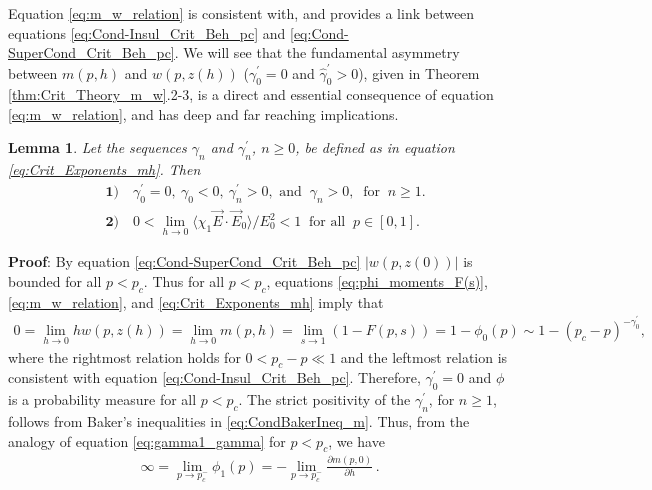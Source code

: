 \documentclass[english,12pt,jmp,graphicx]{revtex4-1}
\newtheorem{lemma}{Lemma}[section]
\newcommand{\gh}{\hat{\gamma}}
\begin{document}
Equation \eqref{eq:m_w_relation} is consistent with, and provides a
link between equations \eqref{eq:Cond-Insul_Crit_Beh_pc} and
\eqref{eq:Cond-SuperCond_Crit_Beh_pc}. We will see that the
fundamental asymmetry  between $m(p,h)$ and $w(p,z(h))$ ($\gamma_0^\prime=0$ and
$\gh_0^\prime>0$), given in Theorem \ref{thm:Crit_Theory_m_w}.2-3, is a
direct and essential consequence of equation \eqref{eq:m_w_relation},
and has deep and far reaching implications.      
%
\begin{lemma}\label{lem:zero_gamma0}
  Let the sequences $\gamma_n$ and $\gamma_n^\prime$, $n\geq0$, be defined as in
  equation \eqref{eq:Crit_Exponents_mh}. Then
  \begin{align*}
    &\mathbf{1)} \quad \gamma_0^\prime=0, \ \gamma_0<0, \ \gamma_n^\prime>0,   \text{ and } \ \gamma_n>0, \
        \text{ for } \ n\geq1. \\
    &\mathbf{2)} \quad 0<\lim_{h\to0}\langle\chi_1\vec{E}\cdot\vec{E}_0\rangle/E_0^2<1 \
         \text{ for all } \ p\in[0,1].
  \end{align*}
\end{lemma}
%
\noindent \textbf{Proof}:
%
By equation \eqref{eq:Cond-SuperCond_Crit_Beh_pc} $|w(p,z(0))|$ is  
bounded for all $p<p_c$. Thus for all $p<p_c$, equations
\eqref{eq:phi_moments_F(s)}, \eqref{eq:m_w_relation},
and \eqref{eq:Crit_Exponents_mh} imply that
%
\begin{align*}
  0=\lim_{h\to0}hw(p,z(h))=\lim_{h\to0}m(p,h)=\lim_{s\to1}(1-F(p,s))=1-\phi_0(p)\sim1-(p_c-p)^{-\gamma_0^\prime},
\end{align*}
%
where the rightmost relation holds for $0<p_c-p\ll1$ and the leftmost
relation is consistent with equation
\eqref{eq:Cond-Insul_Crit_Beh_pc}. Therefore, $\gamma_0^\prime=0$ and $\phi$ is a
probability measure for all $p<p_c$. The strict positivity of the
$\gamma_n^\prime$, for $n\geq1$, follows from Baker's inequalities
in \eqref{eq:CondBakerIneq_m}. Thus, from the analogy of equation
\eqref{eq:gamma1_gamma} for $p<p_c$, we have  
%
\begin{align}\label{eq:div_phi1}
  \infty=\lim_{p\to p_c^-}\phi_1(p)=-\lim_{p\to p_c^-}\frac{\partial m(p,0)}{\partial h}\,.
\end{align}
%
\end{document}
